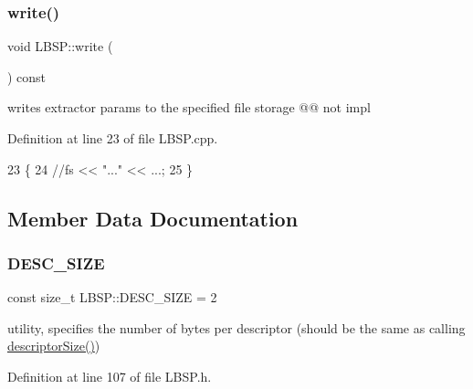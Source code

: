 \subsubsection{\texorpdfstring{write()}{write()}}
{\footnotesize\ttfamily void L\+B\+S\+P\+::write (\begin{DoxyParamCaption}\item[{cv\+::\+File\+Storage \&}]{ }\end{DoxyParamCaption}) const\hspace{0.3cm}{\ttfamily [virtual]}}



writes extractor params to the specified file storage @@ not impl 



Definition at line 23 of file L\+B\+S\+P.\+cpp.


\begin{DoxyCode}
23                                        \{
24     \textcolor{comment}{//fs << "..." << ...;}
25 \}
\end{DoxyCode}


\subsection{Member Data Documentation}
\mbox{\label{class_l_b_s_p_a11167130ddc713921e5bbb0b628d5f74}} 
\subsubsection{\texorpdfstring{D\+E\+S\+C\+\_\+\+S\+I\+ZE}{DESC\_SIZE}}
{\footnotesize\ttfamily const size\+\_\+t L\+B\+S\+P\+::\+D\+E\+S\+C\+\_\+\+S\+I\+ZE = 2\hspace{0.3cm}{\ttfamily [static]}}



utility, specifies the number of bytes per descriptor (should be the same as calling \textquotesingle{}\mbox{\hyperlink{class_l_b_s_p_afc7aa065fa562edd2b16b766910e7806}{descriptor\+Size()}}\textquotesingle{}) 



Definition at line 107 of file L\+B\+S\+P.\+h.

\mbox{\label{class_l_b_s_p_a5f49537c70502b73f32038218a4f8371}} 
